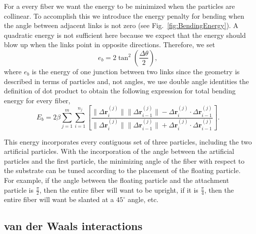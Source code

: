 	For a every fiber we want the energy to be minimized when the particles are collinear. To accomplish this we introduce the energy penalty for bending when the angle between adjacent links is not zero (see Fig.~\ref{fig:BendingEnergy}). A quadratic energy is not sufficient here because we expect that the energy should blow up when the links point in opposite directions. Therefore, we set 
\begin{equation}
	e_b = 2 \tan^2 \left( \frac{\Delta \theta}{2} \right),
\end{equation}
where $e_b$ is the energy of one junction between two links since the geometry is described in terms of particles and, not angles, we use double angle identities the definition of dot product to obtain the following expression for total bending energy for every fiber,
\begin{equation}
	E_b = 2\beta \sum_{j=1}^m \sum_{i=1}^{n_j} \left[ \frac{\|\Delta \textbf{r}_i^{(j)} \| \|\Delta \textbf{r}_{i-1}^{(j)} \| - \Delta \textbf{r}_i^{(j)} \cdot \Delta \textbf{r}_{i-1}^{(j)}}{\|\Delta \textbf{r}_i^{(j)} \| \|\Delta \textbf{r}_{i-1}^{(j)} \| + \Delta \textbf{r}_i^{(j)} \cdot \Delta \textbf{r}_{i-1}^{(j)}} \right].
\end{equation}

	This energy incorporates every contiguous set of three particles, including the two artificial particles. With the incorporation of the angle between the artificial particles and the first particle, the minimizing angle of the fiber with respect to the substrate can be tuned according to the placement of the floating particle. For example, if the angle between the floating particle and the attachment particle is $\frac{\pi}{2}$, then the entire fiber will want to be upright, if it is $\frac{\pi}{4}$, then the entire fiber will want be slanted at a $45^{\circ}$ angle, etc.

\subsection{van der Waals interactions}	

